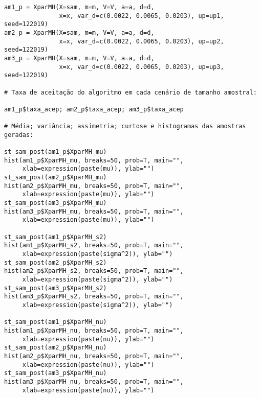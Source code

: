 \begin{verbatim}
am1_p = XparMH(X=sam, m=m, V=V, a=a, d=d,
			   x=x, var_d=c(0.0022, 0.0065, 0.0203), up=up1, seed=122019)
am2_p = XparMH(X=sam, m=m, V=V, a=a, d=d,
			   x=x, var_d=c(0.0022, 0.0065, 0.0203), up=up2, seed=122019)
am3_p = XparMH(X=sam, m=m, V=V, a=a, d=d,
			   x=x, var_d=c(0.0022, 0.0065, 0.0203), up=up3, seed=122019)

# Taxa de aceitação do algoritmo em cada cenário de tamanho amostral:

am1_p$taxa_acep; am2_p$taxa_acep; am3_p$taxa_acep

# Média; variância; assimetria; curtose e histogramas das amostras geradas:

st_sam_post(am1_p$XparMH_mu)
hist(am1_p$XparMH_mu, breaks=50, prob=T, main="",
	 xlab=expression(paste(mu)), ylab="")
st_sam_post(am2_p$XparMH_mu)
hist(am2_p$XparMH_mu, breaks=50, prob=T, main="",
	 xlab=expression(paste(mu)), ylab="")
st_sam_post(am3_p$XparMH_mu)
hist(am3_p$XparMH_mu, breaks=50, prob=T, main="",
	 xlab=expression(paste(mu)), ylab="")

st_sam_post(am1_p$XparMH_s2)
hist(am1_p$XparMH_s2, breaks=50, prob=T, main="",
	 xlab=expression(paste(sigma^2)), ylab="")
st_sam_post(am2_p$XparMH_s2)
hist(am2_p$XparMH_s2, breaks=50, prob=T, main="",
	 xlab=expression(paste(sigma^2)), ylab="")
st_sam_post(am3_p$XparMH_s2)
hist(am3_p$XparMH_s2, breaks=50, prob=T, main="",
	 xlab=expression(paste(sigma^2)), ylab="")

st_sam_post(am1_p$XparMH_nu)
hist(am1_p$XparMH_nu, breaks=50, prob=T, main="",
	 xlab=expression(paste(nu)), ylab="")
st_sam_post(am2_p$XparMH_nu)
hist(am2_p$XparMH_nu, breaks=50, prob=T, main="",
	 xlab=expression(paste(nu)), ylab="")
st_sam_post(am3_p$XparMH_nu)
hist(am3_p$XparMH_nu, breaks=50, prob=T, main="",
	 xlab=expression(paste(nu)), ylab="")
\end{verbatim}

\newpage

